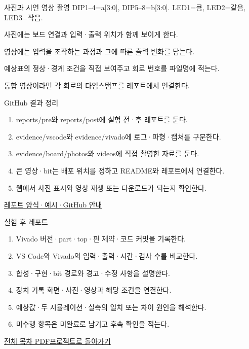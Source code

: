 \begin{frame}{사진과 시연 영상 촬영}\relax
\small
DIP1–4=a[3:0], DIP5–8=b[3:0]. LED1=큼, LED2=같음, LED3=작음.\par\vspace{0.22cm}사진에는 보드 연결과 입력·출력 위치가 함께 보이게 한다.\par\vspace{0.22cm}영상에는 입력을 조작하는 과정과 그에 따른 출력 변화를 담는다.\par\vspace{0.22cm}예상표의 정상·경계 조건을 직접 보여주고 회로 번호를 파일명에 적는다.\par\vspace{0.22cm}통합 영상이라면 각 회로의 타임스탬프를 레포트에서 연결한다.\par
\end{frame}

\begin{frame}{GitHub 결과 정리}\relax
\small
\begin{enumerate}\setlength{\itemsep}{0.22cm}
\item reports/pre와 reports/post에 실험 전·후 레포트를 둔다.
\item evidence/vscode와 evidence/vivado에 로그·파형·캡처를 구분한다.
\item evidence/board/photos와 videos에 직접 촬영한 자료를 둔다.
\item 큰 영상·bit는 배포 위치를 정하고 README와 레포트에서 연결한다.
\item 웹에서 사진 표시와 영상 재생 또는 다운로드가 되는지 확인한다.
\end{enumerate}
\href{https://github.com/Glaysia/ece2_26_2_2/blob/daily/0910/example/fpga_projects_hdl/LAB1/docs/reports.md}{레포트 양식·예시·GitHub 안내}
\end{frame}

\begin{frame}{실험 후 레포트}\relax
\small
\begin{enumerate}\setlength{\itemsep}{0.22cm}
\item Vivado 버전·part·top·핀 제약·코드 커밋을 기록한다.
\item VS Code와 Vivado의 입력·출력·시간·검사 수를 비교한다.
\item 합성·구현·bit 경로와 경고·수정 사항을 설명한다.
\item 장치 기록 화면·사진·영상과 해당 조건을 연결한다.
\item 예상값·두 시뮬레이션·실측의 일치 또는 차이 원인을 해석한다.
\item 미수행 항목은 미완료로 남기고 후속 확인을 적는다.
\end{enumerate}
\href{04.LAB1_00_CONTENTS.pdf}{전체 목차 PDF}\quad\href{https://github.com/Glaysia/fpga-lab-example-legacy-05-comparator4/tree/d8e0f25d8058df9c07084f03cf997ae649fd84af}{프로젝트로 돌아가기}
\end{frame}
\endgroup


